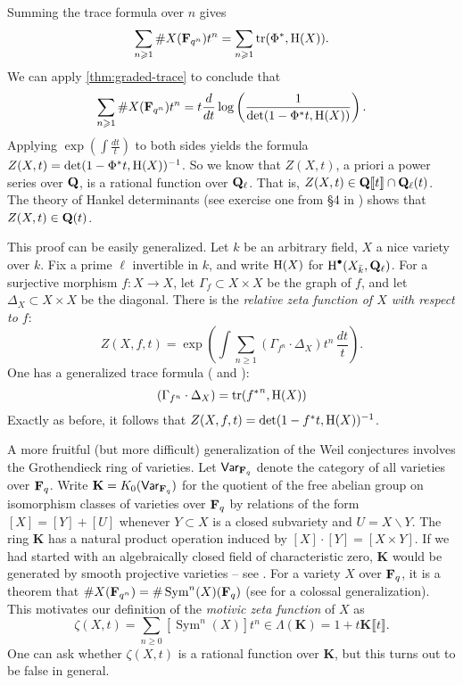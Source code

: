 Summing the trace formula over $n$ gives 
\[
  \sum_{n\geqslant 1} \# X(\mathbf{F}_{q^n}) t^n = \sum_{n\geqslant 1} \operatorname{tr}({\Phi^\ast}, \operatorname{H}(X)) \text{.}
\]
We can apply \autoref{thm:graded-trace} to conclude that 
\[
  \sum_{n\geqslant 1} \# X(\mathbf{F}_{q^n}) t^n =  t\frac{d}{dt} \log\left(\frac{1}{\det(1-\Phi^\ast t, \operatorname{H}(X))}\right) \text{.}
\]
Applying $\exp\left(\int \frac{dt}{t}\right)$ to both sides yields the formula 
$Z(X,t) = \det(1-\Phi^\ast t,\operatorname{H}(X))^{-1}$. So we know that 
$Z(X,t)$, a priori a power series over $\mathbf{Q}$, is a rational function over 
$\mathbf{Q}_\ell$. That is, $Z(X,t)\in \mathbf{Q}\llbracket t\rrbracket \cap \mathbf{Q}_\ell(t)$. 
The theory of Hankel determinants (see exercise one from \S 4 in 
\cite[A.IV]{bo90}) shows that $Z(X,t)\in \mathbf{Q}(t)$. 

This proof can be easily generalized. Let $k$ be an arbitrary field, $X$ a nice 
variety over $k$. Fix a prime $\ell$ invertible in $k$, and write 
$\operatorname{H}(X)$ for $\operatorname{H}^\bullet(X_{\bar k},\mathbf{Q}_\ell)$. For a surjective morphism 
$f:X\to X$, let $\Gamma_f\subset X\times X$ be the graph of $f$, and let 
$\Delta_X\subset X\times X$ be the diagonal. There is the \emph{relative zeta 
function of $X$ with respect to $f$}: 
\[
  Z(X,f,t) = \exp\left(\int \sum_{n\geqslant 1} (\Gamma_{f^n}\cdot \Delta_X) t^n\,\frac{dt}{t}\right) \text{.}
\]
One has a generalized trace formula (\cite[ex.11]{dj-wc} and \cite[IV.3.3]{de77}):
\[
  (\Gamma_{f^n}\cdot \Delta_X) = \operatorname{tr}({f^\ast}^n, \operatorname{H}(X))
\]
Exactly as before, it follows that $Z(X,f,t) = \det(1-f^\ast t,\operatorname{H}(X))^{-1}$. 

A more fruitful (but more difficult) generalization of the Weil conjectures 
involves the Grothendieck ring of varieties. Let $\mathsf{Var}_{\mathbf{F}_q}$ denote 
the category of all varieties over $\mathbf{F}_q$. Write 
$\mathbf K=K_0(\mathsf{Var}_{\mathbf{F}_q})$ for the quotient of the free abelian 
group on isomorphism classes of varieties over $\mathbf{F}_q$ by relations of the 
form $[X]=[Y]+[U]$ whenever $Y\subset X$ is a closed subvariety and 
$U=X\smallsetminus Y$. The ring $\mathbf K$ has a natural product operation 
induced by $[X]\cdot [Y] = [X\times Y]$. If we had started with an 
algebraically closed field of characteristic zero, $\mathbf K$ would be 
generated by smooth projective varieties -- see \cite{bi04}.
For a variety $X$ over $\mathbf{F}_q$, it is a theorem that 
$\# X(\mathbf{F}_{q^n}) = \# \operatorname{Sym}^n(X)(\mathbf{F}_q)$ (see 
\cite[III.2.11]{de77} for a colossal generalization). This motivates our 
definition of the \emph{motivic zeta function} of $X$ as 
\[
  \zeta(X,t) = \sum_{n\geqslant 0} [\operatorname{Sym}^n(X)] t^n \in \Lambda(\mathbf K) = 1+t\mathbf K\llbracket t\rrbracket \text{.}
\]
One can ask whether $\zeta(X,t)$ is a rational function over 
$\mathbf K$, but this turns out to be false in general. 





